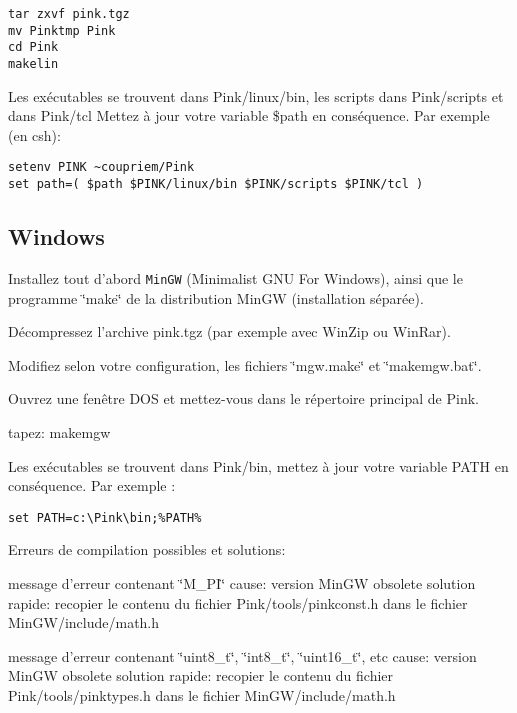 \footnotesize\begin{verbatim}
tar zxvf pink.tgz
mv Pinktmp Pink
cd Pink
makelin
\end{verbatim}\normalsize


Les ex\'{e}cutables se trouvent dans Pink/linux/bin, les scripts dans Pink/scripts et dans Pink/tcl Mettez \`{a} jour votre variable \$path en cons\'{e}quence. Par exemple (en csh):



\footnotesize\begin{verbatim}
setenv PINK ~coupriem/Pink
set path=( $path $PINK/linux/bin $PINK/scripts $PINK/tcl )
\end{verbatim}\normalsize
\subsection{Windows}\label{windows}
Installez tout d'abord {\tt Min\-GW} (Minimalist GNU For Windows), ainsi que le programme \char`\"{}make\char`\"{} de la distribution Min\-GW (installation s\'{e}par\'{e}e).

D\'{e}compressez l'archive pink.tgz (par exemple avec Win\-Zip ou Win\-Rar).

Modifiez selon votre configuration, les fichiers \char`\"{}mgw.make\char`\"{} et \char`\"{}makemgw.bat\char`\"{}.

Ouvrez une fen\^{e}tre DOS et mettez-vous dans le r\'{e}pertoire principal de Pink.

tapez: makemgw

Les ex\'{e}cutables se trouvent dans Pink/bin, mettez \`{a} jour votre variable PATH en cons\'{e}quence. Par exemple :



\footnotesize\begin{verbatim}
set PATH=c:\Pink\bin;%PATH%
\end{verbatim}\normalsize


Erreurs de compilation possibles et solutions:

message d'erreur contenant \char`\"{}M\_\-PI\char`\"{} cause: version Min\-GW obsolete solution rapide: recopier le contenu du fichier Pink/tools/pinkconst.h dans le fichier Min\-GW/include/math.h

message d'erreur contenant \char`\"{}uint8\_\-t\char`\"{}, \char`\"{}int8\_\-t\char`\"{}, \char`\"{}uint16\_\-t\char`\"{}, etc cause: version Min\-GW obsolete solution rapide: recopier le contenu du fichier Pink/tools/pinktypes.h dans le fichier Min\-GW/include/math.h

